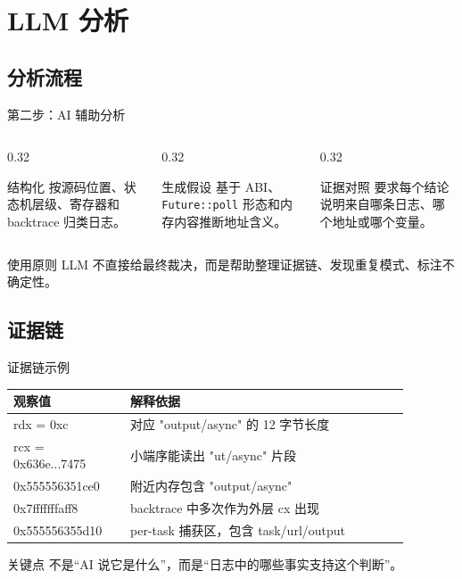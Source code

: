 \documentclass[aspectratio=169,11pt]{beamer}
\begin{document}
\section{LLM 分析}
\subsection{分析流程}

\begin{frame}{第二步：AI 辅助分析}
  \begin{columns}[T,totalwidth=\textwidth]
    \begin{column}{0.32\textwidth}
      \begin{block}{结构化}
        按源码位置、状态机层级、寄存器和 backtrace 归类日志。
      \end{block}
    \end{column}
    \begin{column}{0.32\textwidth}
      \begin{block}{生成假设}
        基于 ABI、\texttt{Future::poll} 形态和内存内容推断地址含义。
      \end{block}
    \end{column}
    \begin{column}{0.32\textwidth}
      \begin{block}{证据对照}
        要求每个结论说明来自哪条日志、哪个地址或哪个变量。
      \end{block}
    \end{column}
  \end{columns}

  \vspace{0.8em}
  \begin{alertblock}{使用原则}
    LLM 不直接给最终裁决，而是帮助整理证据链、发现重复模式、标注不确定性。
  \end{alertblock}
\end{frame}

\subsection{证据链}

\begin{frame}{证据链示例}
  \begin{tabular}{>{\ttfamily}p{0.26\linewidth}p{0.62\linewidth}}
    \toprule
    观察值 & 解释依据 \\
    \midrule
    rdx = 0xc & 对应 "output/async" 的 12 字节长度 \\
    rcx = 0x636e...7475 & 小端序能读出 "ut/async" 片段 \\
    0x555556351ce0 & 附近内存包含 "output/async" \\
    0x7fffffffaff8 & backtrace 中多次作为外层 cx 出现 \\
    0x555556355d10 & per-task 捕获区，包含 task/url/output \\
    \bottomrule
  \end{tabular}

  \vspace{0.8em}
  \begin{block}{关键点}
    不是“AI 说它是什么”，而是“日志中的哪些事实支持这个判断”。
  \end{block}
\end{frame}
\end{document}
